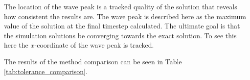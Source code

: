   The location of the wave peak is a tracked quality of the solution that reveals how consistent the results are.
  The wave peak is described here as the maximum value of the solution at the final timestep calculated.
  The ultimate goal is that the simulation solutions be converging towards the exact solution.
  To see this here the $x$-coordinate of the wave peak is tracked.

  The results of the method comparison can be seen in Table \ref{tab:tolerance_comparison}.
  


  
  
